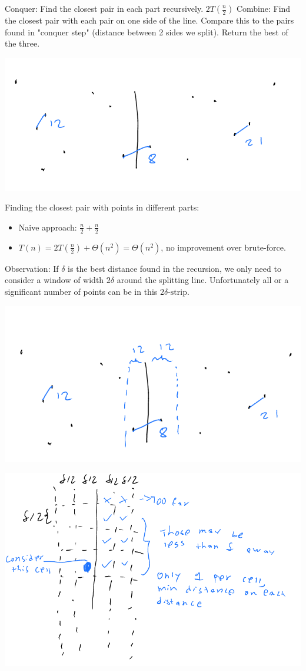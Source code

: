 \documentclass[11pt]{article}
\begin{document}
Conquer: Find the closest pair in each part recursively. \(2T(\frac{n}{2})\)
Combine: Find the closest pair with each pair on one side of the line. Compare this to the pairs found in "conquer step" (distance between 2 sides we split). Return the best of the three.
\begin{center}
\includegraphics[width=.9\linewidth]{./Images/i76.png}
\end{center}
Finding the closest pair with points in different parts: 
\begin{itemize}
\item Naive approach: \(\frac{n}{2}+\frac{n}{2}\)
\item \(T(n)=2T(\frac{n}{2})+\Theta(n^2) = \Theta(n^2)\), no improvement over brute-force.
\end{itemize}
Observation: If \(\delta\) is the best distance found in the recursion, we only need to consider a window of width \(2\delta\) around the splitting line. Unfortunately all or a significant number of points can be in this \(2\delta\text{-strip}\).
\begin{center}
\includegraphics[width=.9\linewidth]{./Images/i77.png}
\end{center}
\begin{center}
\includegraphics[width=.9\linewidth]{./Images/i78.png}
\end{center}
\end{document}
